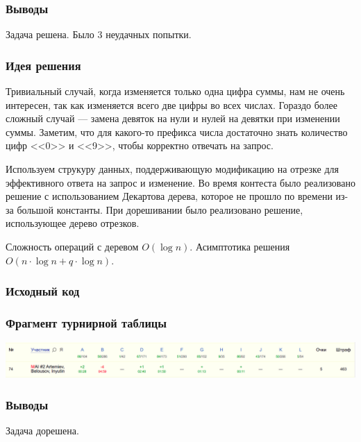 \subsubsection*{Выводы}
Задача решена. Было 3 неудачных попытки.
\pagebreak


\subsubsection*{Идея решения}
Тривиальный случай, когда изменяется только одна цифра суммы, нам не очень интересен, так как изменяется всего две цифры во всех числах. Гораздо более сложный случай --- замена девяток на нули и нулей на девятки при изменении суммы. Заметим, что для какого-то префикса числа достаточно знать количество цифр <<0>> и <<9>>, чтобы корректно отвечать на запрос.

Используем струкуру данных, поддерживающую модификацию на отрезке для эффективного ответа на запрос и изменение. Во время контеста было реализовано решение с использованием Декартова дерева, которое не прошло по времени из-за большой константы. При дорешивании было реализовано решение, использующее дерево отрезков.

Сложность операций с деревом $O(\log{n})$. Асимптотика решения $O(n \cdot \log{n} + q \cdot \log{n})$.

\subsubsection*{Исходный код}

\subsubsection*{Фрагмент турнирной таблицы}
\includegraphics[width=\textwidth]{images/gp_edg.png}\newline\noindent
\subsubsection*{Выводы}
Задача дорешена.
\pagebreak

